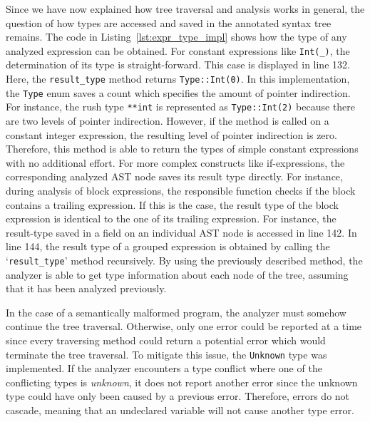 Since we have now explained how tree traversal and analysis works in general, the question of how types are accessed and saved in the annotated syntax tree remains.
The code in Listing~\ref{lst:expr_type_impl} shows how the type of any analyzed expression can be obtained.
For constant expressions like \verb|Int(_)|, the determination of its type is straight-forward.
This case is displayed in line 132.
Here, the \texttt{result\_type} method returns \verb|Type::Int(0)|.
In this implementation, the \texttt{Type} enum saves a count which specifies the amount of pointer indirection.
For instance, the rush type \texttt{**int} is represented as \verb|Type::Int(2)| because there are two levels of pointer indirection.
However, if the method is called on a constant integer expression, the resulting level of pointer indirection is zero.
Therefore, this method is able to return the types of simple constant expressions with no additional effort.
For more complex constructs like if-expressions, the corresponding analyzed AST node saves its result type directly.
For instance, during analysis of block expressions, the responsible function checks if the block contains a trailing expression.
If this is the case, the result type of the block expression is identical to the one of its trailing expression.
For instance, the result-type saved in a field on an individual AST node is accessed in line 142.
In line 144, the result type of a grouped expression is obtained by calling the `\texttt{result\_type}' method recursively.
By using the previously described method, the analyzer is able to get type information about each node of the tree, assuming that it has been analyzed previously.

In the case of a semantically malformed program, the analyzer must somehow continue the tree traversal.
Otherwise, only one error could be reported at a time since every traversing method could return a potential error which would terminate the tree traversal.
To mitigate this issue, the \texttt{Unknown} type was implemented.
If the analyzer encounters a type conflict where one of the conflicting types is \emph{unknown},
it does not report another error since the unknown type could have only been caused by a previous error.
Therefore, errors do not cascade, meaning that an undeclared variable will not cause another type error.



